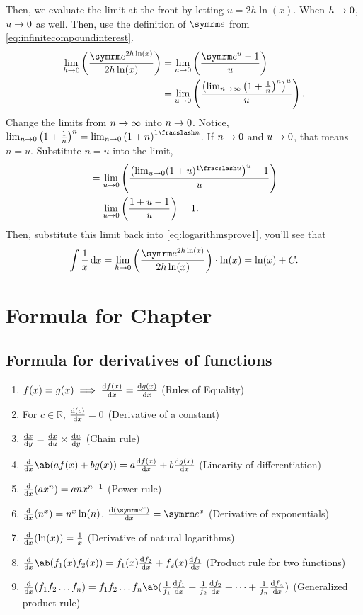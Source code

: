 Then, we evaluate the limit at the front by letting $u = 2h\ln(x)$. When $h \rightarrow 0$, $u \rightarrow 0$ as well. Then, use the definition of $\e$ from \cref{eq:infinitecompoundinterest}.
\begin{align*}
    \lim_{h \appr 0}\left(\frac{\e^{2h\ln(x)}}{2h\ln(x)}\right) &= \lim_{u \appr 0}\left(\frac{\e^u - 1}{u}\right) \\
    &= \lim_{u \appr 0}\left(\frac{\left(\lim_{n \appr \infty}\left(1 + \frac{1}{n}\right)^n\right)^u}{u}\right).
\end{align*}
Change the limits from $n \rightarrow \infty$ into $n \rightarrow 0$. Notice, $\lim_{n \appr 0}\left(1 + \frac{1}{n}\right)^n = \lim_{n \appr 0}\left(1 + n\right)^{\flatfrac{1}{n}}$. If $n \rightarrow 0$ and $u \rightarrow 0$, that means $n = u$. Substitute $n = u$ into the limit,
\begin{align*}
    &= \lim_{u \appr 0}\left(\frac{\left(\lim_{u \appr 0}(1 + u)^{\flatfrac{1}{u}}\right)^u - 1}{u}\right) \\
    &= \lim_{u \appr 0}\left(\frac{1 + u - 1}{u}\right) = 1.
\end{align*}
Then, substitute this limit back into \cref{eq:logarithmsprove1}, you'll see that
\begin{equation*}
    \int\frac{1}{x}\odif{x} = \lim_{h \appr 0}\left(\frac{\e^{2h\ln(x)}}{2h\ln(x)}\right) \cdot \ln(x) = \ln(x) + C.
\end{equation*}

\section{Formula for Chapter \thechapter}

\everymath{\displaystyle}
\subsection{Formula for derivatives of functions}

\begin{enumerate}
    \item $f(x) = g(x) \implies \odv{f(x)}{x} = \odv{g(x)}{x}$ (Rules of Equality)
    \item For $c \in \mathbb{R}$, $\odv{(c)}{x} = 0$ (Derivative of a constant)
    \item $\odv{x}{y} = \odv{x}{u} \times \odv{u}{y}$ (Chain rule)
    \item $\odv*{\ab(af(x) + bg(x))}{x} = a\odv{f(x)}{x} + b\odv{g(x)}{x}$ (Linearity of differentiation)
    \item $\odv*{(ax^n)}{x} = anx^{n - 1}$ (Power rule)
    \item $\odv*{(n^x)}{x} = n^x\ln(n)$, $\odv{(\e^x)}{x} = \e^x$ (Derivative of exponentials)
    \item $\odv*{(\ln(x))}{x} = \frac{1}{x}$ (Derivative of natural logarithms)
	\item $\odv*{\ab(f_1(x)f_2(x))}{x} = f_1(x)\odv{f_2}{x} + f_2(x)\odv{f_1}{x}$ (Product rule for two functions)
	\item $\odv*{(f_1f_2\dots f_n)}{x} = f_1f_2\dots f_n\ab(\frac{1}{f_1}\odv{f_1}{x} + \frac{1}{f_2}\odv{f_2}{x} + \dots + \frac{1}{f_n}\odv{f_n}{x})$ (Generalized product rule)
\end{enumerate}

